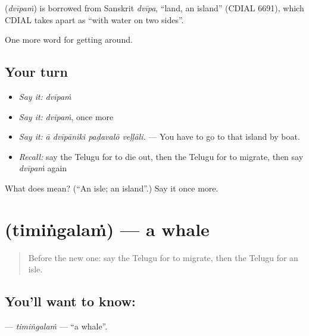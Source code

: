\begin{cousinweb}
\textbf{} (\emph{dvīpaṁ}) is borrowed from Sanskrit \emph{dvīpa}, \textquotedblleft{}land, an island\textquotedblright{} (CDIAL 6691), which CDIAL takes apart as \textquotedblleft{}with water on two sides\textquotedblright{}.
\end{cousinweb}

\begin{grammarlens}[title={What you've built}]
One more word for getting around.
\end{grammarlens}

\subsection*{Your turn}
\begin{itemize}
\raggedright
  \item \emph{Say it:} \emph{dvīpaṁ}
  \item \emph{Say it:} \emph{dvīpaṁ}, once more
  \item \emph{Say it:} \emph{ā dvīpāniki paḍavalō veḷḷāli.} — You have to go to that island by boat.
  \item \emph{Recall:} say the Telugu for to die out, then the Telugu for to migrate, then say \emph{dvīpaṁ} again
\end{itemize}

\begin{tcolorbox}[breakable,colback=teal!4,colframe=teal!35!black,title={Before you move on}]
What does  mean? (\textquotedblleft{}An isle; an island\textquotedblright{}.) Say it once more.
\end{tcolorbox}
\section[\texorpdfstring{\te{తిమింగలం} (timiṅgalaṁ)}{తిమింగలం (timiṅgalaṁ)}]{ (timiṅgalaṁ) — a whale}

\label{lesson:TE-C473-timingalam}



\begin{quote}
Before the new one: say the Telugu for to migrate, then the Telugu for an isle.
\end{quote}

\subsection*{You'll want to know: }
\textbf{} — \emph{timiṅgalaṁ} — \textquotedblleft{}a whale\textquotedblright{}.

